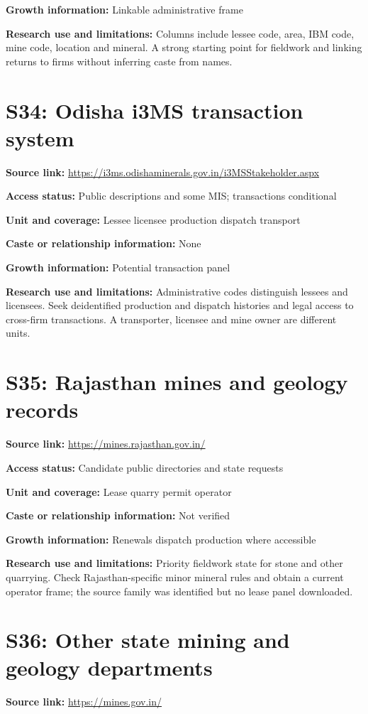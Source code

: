\documentclass[11pt,a4paper]{report}
\begin{document}
\textbf{Growth information:} Linkable administrative frame

\textbf{Research use and limitations:} Columns include lessee code, area, IBM code, mine code, location and mineral. A strong starting point for fieldwork and linking returns to firms without inferring caste from names.

\section{S34: Odisha i3MS transaction system}\hypertarget{S34}{}
\textbf{Source link:} \url{https://i3ms.odishaminerals.gov.in/i3MSStakeholder.aspx}

\textbf{Access status:} Public descriptions and some MIS; transactions conditional

\textbf{Unit and coverage:} Lessee licensee production dispatch transport

\textbf{Caste or relationship information:} None

\textbf{Growth information:} Potential transaction panel

\textbf{Research use and limitations:} Administrative codes distinguish lessees and licensees. Seek deidentified production and dispatch histories and legal access to cross-firm transactions. A transporter, licensee and mine owner are different units.

\section{S35: Rajasthan mines and geology records}\hypertarget{S35}{}
\textbf{Source link:} \url{https://mines.rajasthan.gov.in/}

\textbf{Access status:} Candidate public directories and state requests

\textbf{Unit and coverage:} Lease quarry permit operator

\textbf{Caste or relationship information:} Not verified

\textbf{Growth information:} Renewals dispatch production where accessible

\textbf{Research use and limitations:} Priority fieldwork state for stone and other quarrying. Check Rajasthan-specific minor mineral rules and obtain a current operator frame; the source family was identified but no lease panel downloaded.

\section{S36: Other state mining and geology departments}\hypertarget{S36}{}
\textbf{Source link:} \url{https://mines.gov.in/}
\end{document}
